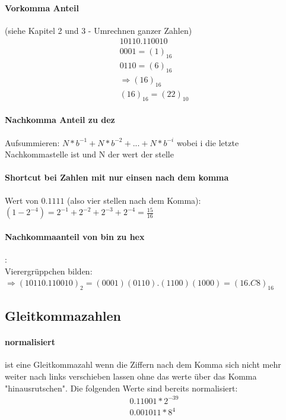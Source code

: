 \documentclass[a4paper]{article}
\begin{document}
		\paragraph{Vorkomma Anteil} 
			(siehe Kapitel 2 und 3 - Umrechnen ganzer Zahlen)
			\begin{eqnarray}
			10110.110010 \\
			0001 = (1)_{16} \\
			0110 = (6)_{16}\\
			\Rightarrow (16)_{16} \\
			(16)_{16} = (22)_{10}
			\end{eqnarray}
		
		\paragraph{Nachkomma Anteil zu dez}
			Aufsummieren:
			$N*b^{-1}+N*b^{-2}+...+N*b^{-i} $ wobei i die letzte Nachkommastelle ist und N der wert der stelle
		
		\paragraph{Shortcut bei Zahlen mit nur einsen nach dem komma}
			Wert von $0.1111$ (also vier stellen nach dem Komma): $(1-2^{-4}) = 2^{-1}+2^{-2}+2^{-3}+2^{-4} = \frac{15}{16}$
		
		\paragraph{Nachkommaanteil von bin zu hex}:\\
			Vierergrüppchen bilden: $ \Rightarrow (10110.110010)_{2} = (0001)(0110).(1100)(1000) = (16.C8)_{16}$ 
		
	\subsection{Gleitkommazahlen}
		\paragraph{normalisiert} 
			ist eine Gleitkommazahl wenn die Ziffern nach dem Komma sich nicht mehr weiter nach links verschieben lassen ohne das werte über das Komma "hinausrutschen". Die folgenden Werte sind bereits normalisiert:
			\begin{eqnarray}
				0.11001*2^{-39} \\
				0.001011*8^4
			\end{eqnarray}
\end{document}

